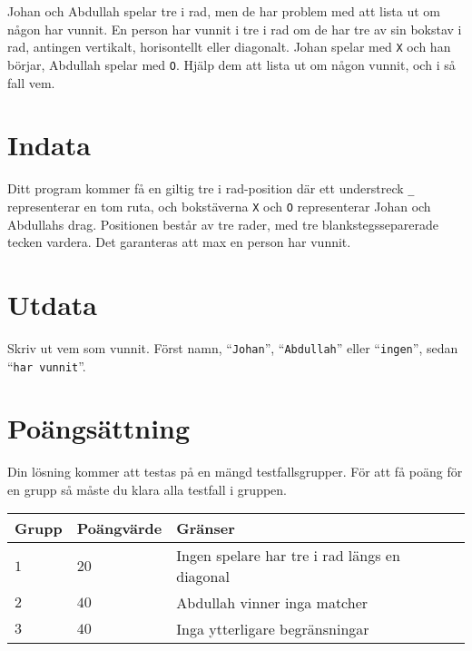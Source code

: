 \noindent
Johan och Abdullah spelar tre i rad, men de har problem med att lista ut om någon har vunnit.
En person har vunnit i tre i rad om de har tre av sin bokstav i rad, antingen vertikalt, horisontellt eller diagonalt.
Johan spelar med \texttt{X} och han börjar, Abdullah spelar med \texttt{O}. Hjälp dem att lista ut om någon vunnit, och i så fall vem.

\section*{Indata}
\noindent

Ditt program kommer få en giltig tre i rad-position där ett understreck \texttt{\_} representerar en tom ruta, och bokstäverna \texttt{X} och \texttt{O} representerar Johan och Abdullahs drag.
Positionen består av tre rader, med tre blankstegsseparerade tecken vardera. Det garanteras att max en person har vunnit.

\section*{Utdata}
\noindent
Skriv ut vem som vunnit.
\noindent
Först namn, ``\texttt{Johan}'', ``\texttt{Abdullah}'' eller ``\texttt{ingen}'', sedan ``\texttt{har vunnit}''.
\section*{Poängsättning}
\noindent
Din lösning kommer att testas på en mängd testfallsgrupper.
\noindent
För att få poäng för en grupp så måste du klara alla testfall i gruppen.

\noindent
\begin{tabular}{| l | l | l |}
\hline
  Grupp & Poängvärde & Gränser \\ \hline
  $1$    & $20$       &  Ingen spelare har tre i rad längs en diagonal \\ \hline 
  $2$    & $40$       &  Abdullah vinner inga matcher \\ \hline
  $3$    & $40$       &  Inga ytterligare begränsningar \\ \hline
\end{tabular}
